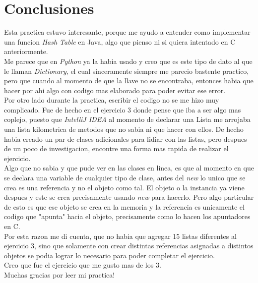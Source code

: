 \documentclass{article}
\begin{document}
			\newpage

	
	\section{Conclusiones}
	
	Esta practica estuvo interesante, porque me ayudo a entender como implementar una funcion \textit{Hash Table} en Java, algo que pienso ni si quiera intentado en C anteriormente.\\
	
	Me parece que en \textit{Python} ya la habia usado y creo que es este tipo de dato al que le llaman \textit{Dictionary}, el cual sinceramente siempre me parecio bastente practico, pero que cuando al momento de que la llave no se encontraba, entonces habia que hacer por ahi algo con codigo mas elaborado para poder evitar ese error.\\
	
	Por otro lado durante la practica, escribir el codigo no se me hizo muy complicado. Fue de hecho en el ejercicio 3 donde pense que iba a ser algo mas coplejo, puesto que \textit{IntelliJ IDEA} al momento de declarar una Lista me arrojaba una lista kilometrica de metodos que no sabia ni que hacer con ellos. De hecho habia creado un par de clases adicionales para lidiar con las listas, pero despues de un poco de investigacion, encontre una forma mas rapida de realizar el ejercicio.\\
	
	Algo que no sabia y que pude ver en las clases en linea, es que al momento en que se declara una variable de cualquier tipo de clase, antes del \textit{new} lo unico que se crea es una referencia y no el objeto como tal. El objeto o la instancia ya viene despues y este se crea precisamente usando \textit{new} para hacerlo. Pero algo particular de esto es que ese objeto se crea en la memoria y la referencia es unicamente el codigo que "apunta" hacia el objeto, precisamente como lo hacen los apuntadores en C.\\
	
	Por esta razon me di cuenta, que no habia que agregar 15 listas diferentes al ejercicio 3, sino que solamente con crear distintas referencias asignadas a distintos objetos se podia lograr lo necesario para poder completar el ejercicio.\\
	
	Creo que fue el ejercicio que me gusto mas de los 3.\\
	
	Muchas gracias por leer mi practica!\\
	
	  
		
\end{document}

